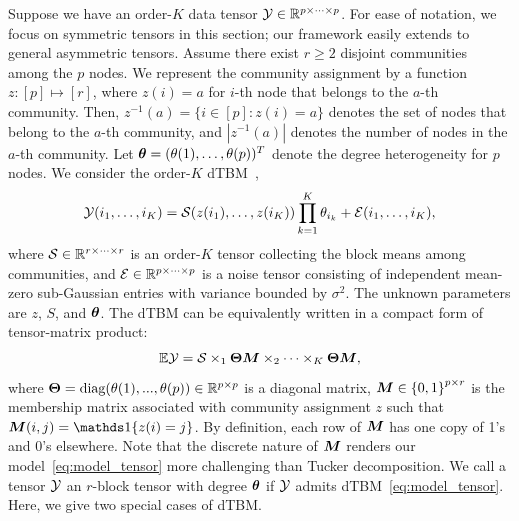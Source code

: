 \documentclass[lettersize,onecolumn,journal]{IEEEtran}
\theoremstyle{definition}
\theoremstyle{definition}
\newcommand{\offf}[1]{\left\{#1\right\}}
\begin{document}
Suppose we have an order-$K$ data tensor $\mathcal{Y} \in \mathbb{R}^{p \times \cdots \times p}$. For ease of notation, we focus on symmetric tensors in this section; our framework easily extends to general asymmetric tensors. Assume there exist $r \geq 2$  disjoint communities among the $p$ nodes. We represent the community assignment by a function $z \colon [p]\mapsto[r]$, where $z(i) = a$ for $i$-th node that belongs to the $a$-th community. Then, $z^{-1}(a)=\{i\in[p]\colon z(i)=a\}$ denotes the set of nodes that belong to the $a$-th community, and $|z^{-1}(a)|$ denotes the number of nodes in the $a$-th community.
Let $\boldsymbol{\theta}=(\theta(1),\ldots,\theta(p))^T$ denote the degree heterogeneity for $p$ nodes. We consider the order-$K$ dTBM~\citep{ghoshdastidar2017consistency,ke2019community},
\begin{equation}\label{eq:model_margin}
    \tY(i_1,\ldots,i_K) = \tS(z(i_1),\ldots,z(i_K)) \prod_{k = 1}^K\theta_{i_k} + \tE(i_1,\ldots,i_K), 
\end{equation}
\normalsize
where $\mathcal{S} \in \mathbb{R}^{r \times \cdots \times r}$ is an order-$K$ tensor collecting the block means among communities, and $\mathcal{E}\in\mathbb{R}^{p\times \cdots \times p}$ is a noise tensor consisting of independent mean-zero sub-Gaussian entries with variance bounded by $\sigma^2$. The unknown parameters are $z$, $S$, and $\boldsymbol{\theta}$. The dTBM can be equivalently written in a compact form of tensor-matrix product:
\begin{equation}\label{eq:model_tensor}
 \mathbb{E}\tY = \tS \times_1 \mTheta \mM \times_2 \cdots \times_K  \mTheta \mM,
\end{equation}
where $\boldsymbol{\Theta} = \text{diag}(\theta(1),...,\theta(p)) \in \mathbb{R}^{p \times p}$ is a diagonal matrix, $\mM \in \offf{0,1}^{p \times r}$ is the membership matrix associated with community assignment $z$ such that $\mM(i,j)=\ind\{z(i)=j\}$. By definition, each row of $\bm M$ has one copy of 1's and 0's elsewhere. Note that the discrete nature of $\bm M$ renders our model~\eqref{eq:model_tensor} more challenging than Tucker decomposition. %
We call a tensor $\mathcal{Y}$ an $r$-block tensor with degree $\boldsymbol{\theta}$
if $\mathcal{Y}$ admits dTBM~\eqref{eq:model_tensor}. Here, we give two special cases of dTBM.
\end{document}
